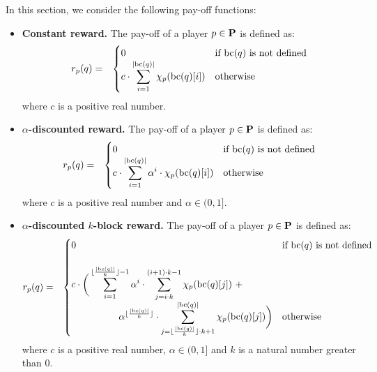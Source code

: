 In this section, we consider the following pay-off functions:
\begin{itemize}
\item {\bf Constant reward.} The pay-off of a player $p \in \mathbf{P}$ is defined as:
\begin{eqnarray*}
r_p(q) & = & 
\begin{cases}
0 & \text{if } \text{bc}(q) \text{ is not defined}\\
{\displaystyle c \cdot \sum_{i=1}^{|\text{bc}(q)|} \chi_p(\text{bc}(q)[i])} & \text{otherwise}
\end{cases}
\end{eqnarray*}
where $c$ is a positive real number.

\item {\bf $\alpha$-discounted reward.} The pay-off of a player $p \in \mathbf{P}$ is defined as:
\begin{eqnarray*}
r_p(q) & = & 
\begin{cases}
0 & \text{if } \text{bc}(q) \text{ is not defined}\\
{\displaystyle c \cdot \sum_{i=1}^{|\text{bc}(q)|} \alpha^i \cdot \chi_p(\text{bc}(q)[i])} & \text{otherwise}
\end{cases}
\end{eqnarray*}
where $c$ is a positive real number and $\alpha \in (0,1]$.

\item {\bf $\alpha$-discounted $k$-block reward.} The pay-off of a player $p \in \mathbf{P}$ is defined as:
\begin{eqnarray*}
r_p(q) & = & 
\begin{cases}
0 & \text{if } \text{bc}(q) \text{ is not defined}\\
\\
{\displaystyle c \cdot \bigg(
\sum_{i=1}^{\lfloor\frac{|\text{bc}(q)|}{k}\rfloor-1}
\alpha^i \cdot \sum_{j=i \cdot k}^{(i+1) \cdot k -1} \chi_p(\text{bc}(q)[j])
\ +}\\
{\displaystyle  \hspace{50pt} \alpha^{\lfloor\frac{|\text{bc}(q)|}{k}\rfloor} \cdot \sum_{j= \lfloor\frac{|\text{bc}(q)|}{k}\rfloor \cdot k + 1}^{|\text{bc}(q)|}  \chi_p(\text{bc}(q)[j])\bigg)}
& \text{otherwise}
\end{cases}
\end{eqnarray*}
where $c$ is a positive real number, $\alpha \in (0,1]$ and $k$ is a natural number greater than 0.
\end{itemize}
